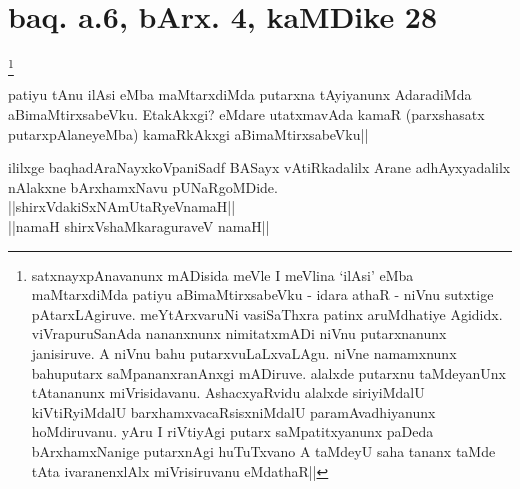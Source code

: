 \section*{baq. a.6, bArx. 4, kaMDike 28}

\footnote[1]{satxnayxpAnavanunx mADisida meVle I meVlina `ilAsi' eMba 
maMtarxdiMda patiyu aBimaMtirxsabeVku - idara athaR - niVnu sutxtige 
pAtarxLAgiruve. meYtArxvaruNi vasiSaThxra patinx aruMdhatiye Agididx. 
viVrapuruSanAda nananxnunx nimitatxmADi niVnu putarxnanunx janisiruve. 
A niVnu bahu putarxvuLaLxvaLAgu. niVne namamxnunx bahuputarx 
saMpananxranAnxgi mADiruve. alalxde putarxnu taMdeyanUnx tAtananunx 
miVrisidavanu. AshacxyaRvidu alalxde siriyiMdalU kiVtiRyiMdalU 
barxhamxvacaRsisxniMdalU paramAvadhiyanunx hoMdiruvanu. yAru I 
riVtiyAgi putarx saMpatitxyanunx paDeda bArxhamxNanige putarxnAgi 
huTuTxvano A taMdeyU saha tananx taMde tAta ivaranenxlAlx 
miVrisiruvanu eMdathaR||}\stext

\begin{artha}
patiyu tAnu ilAsi eMba maMtarxdiMda putarxna tAyiyanunx AdaradiMda 
aBimaMtirxsabeVku. EtakAkxgi? eMdare utatxmavAda kamaR (parxshasatx 
putarxpAlaneyeMba) kamaRkAkxgi aBimaMtirxsabeVku||
\end{artha}

\begin{center}
ililxge baqhadAraNayxkoVpaniSadf BASayx vAtiRkadalilx Arane 
adhAyxyadalilx nAlakxne bArxhamxNavu pUNaRgoMDide.\\
||shirxVdakiSxNAmUtaRyeVnamaH||\\
||namaH shirxVshaMkaraguraveV namaH||
\end{center}

